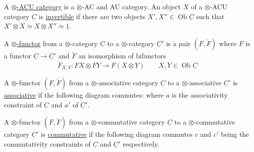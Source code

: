 A \uline{$\otimes$-ACU category} is a $\otimes$-AC and AU category. An object $X$ of a $\otimes$-ACU category $\underline{C}$ is \uline{invertible} if there are two objects $X',X''\in\operatorname{Ob}\underline{C}$ such that $X'\otimes X\simeq X\otimes X''\simeq\underline{1}$.

A \uline{$\otimes$-functor} from a $\otimes$-category $\underline{C}$ to a $\otimes$-category $\underline{C}'$ is a pair $(F,\breve F)$ where $F$ is a functor $\underline{C}\longrightarrow\underline{C}'$ and $\breve F$ an isomorphism of bifunctors
\[
\breve F_{X,Y}:FX\otimes FY\longrightarrow F(X\otimes Y)\qquad X,Y\in\operatorname{Ob}\underline{C}
\]

A $\otimes$-functor $(F,\breve F)$ from a $\otimes$-associative category $\underline{C}$ to a $\otimes$-associative  $\underline{C}'$ is \uline{associative} if the following diagram commutes:
where $a$ is the associativity constraint of $\underline{C}$ and $a'$ of $\underline{C}'$.

A $\otimes$-functor $(F,\breve F)$ from a $\otimes$-commutative category $\underline{C}$ to a $\otimes$-commutative category $\underline{C}'$ is \uline{commutative} if the following diagram commutes
$c$ and $c'$ being the commutativity constraints of $\underline{C}$ and $\underline{C}'$ respectively.


